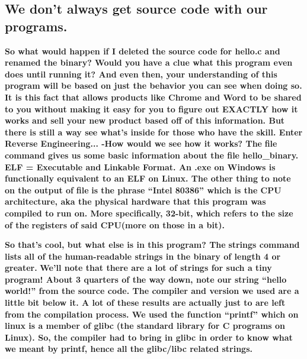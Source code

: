 \subsection{We don't always get source code with our programs.}

\textbf{\newline
So what would happen if I deleted the source code for hello.c and renamed the binary? Would you have a clue what this
program even does until running it? And even then, your understanding of this program will be based on just the
behavior you can see when doing so. It is this fact that allows products like Chrome and Word to be shared to you
without making it easy for you to figure out EXACTLY how it works and sell your new product based off of this
information.  But there is still a way see what's inside for those who have the skill. Enter Reverse
Engineering...\newline
\newline
{}-How would we see how it works? The }\textbf{\textcolor[rgb]{0.21960784,0.4627451,0.11372549}{file }}\textbf{command
gives us some basic information about the file hello\_binary. ELF = Executable and Linkable Format. An .exe on Windows
is functionally equivalent to an ELF on Linux. The other thing to note on the output of
}\textbf{\textcolor[rgb]{0.21960784,0.4627451,0.11372549}{file}}\textbf{ is the phrase ``Intel 80386'' which is the CPU
}\textbf{\textcolor[rgb]{0.21960784,0.4627451,0.11372549}{architecture, }}\textbf{aka the physical hardware that this
program was compiled to run on. More specifically, 32-bit, which refers to the size of the
}\textbf{\textcolor[rgb]{0.21960784,0.4627451,0.11372549}{registers }}\textbf{of said CPU(more on those in a bit).}

\textbf{ }  
 

\textbf{So that's cool, but what else is in this program? The
}\textbf{\textcolor[rgb]{0.21960784,0.4627451,0.11372549}{strings }}\textbf{command lists all of the human-readable
strings in the binary of length 4 or greater. \newline
}  
 \textbf{\newline
We'll note that there are a lot of strings for such a tiny program! About 3 quarters of the way down, note our string
``hello world!'' from the source code. The compiler and version we used are a little bit below it. A lot of these
results are actually just to are left from the compilation process. We used the function ``printf'' which on linux is a
member of}\textbf{\textcolor[rgb]{0.21960784,0.4627451,0.11372549}{ glibc}}\textbf{ (the standard library for C
programs on Linux). So, the compiler had to bring in glibc in order to know what we meant by printf, hence all the
glibc/libc related strings.
}
